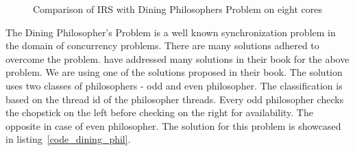 {\begin{figure}[h]
     \centering
     \caption{Comparison of IRS with Dining Philosophers Problem on eight cores}
\end{figure}

The Dining Philosopher's Problem is a well known synchronization problem in the domain of concurrency problems. 
There are many solutions adhered to overcome the problem. 
\citet{silberschatz2014operating} have addressed many solutions in their book for the above problem. 
We are using one of the solutions proposed in their book. 
The solution uses two classes of philosophers - odd and even philosopher. 
The classification is based on the thread id of the philosopher threads. 
Every odd philosopher checks the chopstick on the left before checking on the right for availability. 
The opposite in case of even philosopher. 
The solution for this problem is showcased in listing~\ref{code_dining_phil}.

}
